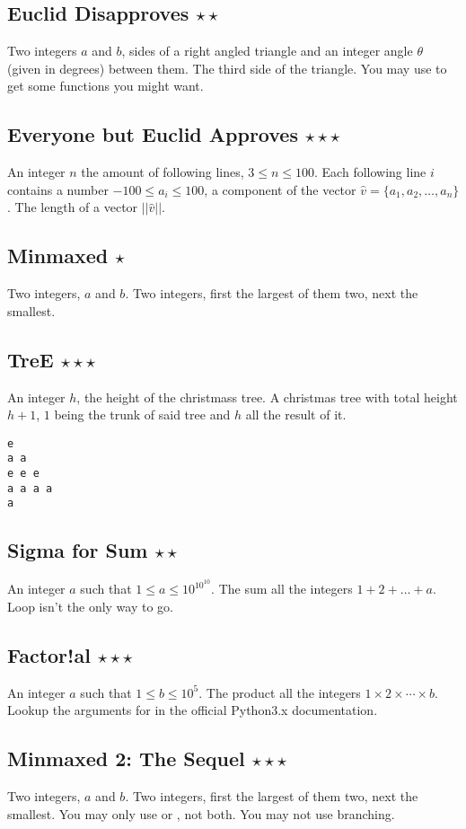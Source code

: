 \subsection{Euclid Disapproves $\star\star$}
\In
Two integers $a$ and $b$, sides of a right angled triangle and an integer angle
$\theta$ (given in degrees) between them.
\Out
The third side of the triangle.
\Hint
You may use  to get some functions you might want.

\subsection{Everyone but Euclid Approves $\star\star\star$}
\In
An integer $n$ the amount of following lines, $3 \leq n \leq 100$. 
Each following line $i$ contains a number $-100 \leq a_i \leq 100$, a 
component of the vector $\hat{v} = \{a_1, a_2, \dots, a_n\}$.
\Out
The length of a vector $||\hat{v}||$.

\subsection{Minmaxed $\star$}
\In
Two integers, $a$ and $b$.
\Out
Two integers, first the largest of them two, next the smallest.

\subsection{TreE $\star\star\star$}
\In
An integer $h$, the height of the christmass tree.
\Out
A christmas tree with total height $h + 1$, $1$ being the trunk of said
tree and $h$ all the result of it.
\begin{verbatim}
e
a a
e e e 
a a a a
a
\end{verbatim}

\subsection{Sigma for Sum $\star\star$}
\In
An integer $a$ such that $1 \leq a \leq 10^{10^{10}}$.
\Out
The sum all the integers $1 + 2 + \dots + a$.
\Hint
Loop isn't the only way to go.

\subsection{Factor!al $\star\star\star$}
\In
An integer $a$ such that $1 \leq b \leq 10^{5}$.
\Out
The product all the integers $1 \times 2 \times \cdots \times b$.
\Hint
Lookup the arguments for  in the official Python3.x documentation.

\subsection{Minmaxed 2: The Sequel $\star\star\star$}
\In
Two integers, $a$ and $b$.
\Out
Two integers, first the largest of them two, next the smallest.
\Note
You may  only use  or , not both. You may not use branching.
